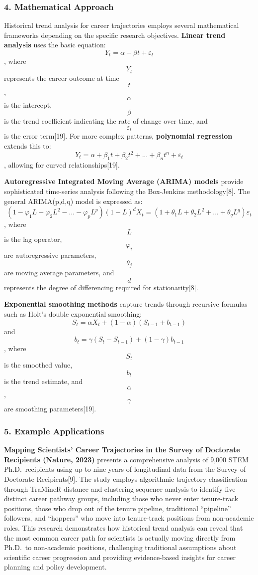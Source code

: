 \documentclass[./main.tex]{subfiles}
\begin{document}
\subsubsection{4. Mathematical Approach}\label{mathematical-approach}

Historical trend analysis for career trajectories employs several
mathematical frameworks depending on the specific research objectives.
\textbf{Linear trend analysis} uses the basic equation:
\[Y_t = α + βt + ε_t\], where \[Y_t\] represents the career outcome at
time \[t\], \[α\] is the intercept, \[β\] is the trend coefficient
indicating the rate of change over time, and \[ε_t\] is the error
term{[}19{]}. For more complex patterns, \textbf{polynomial regression}
extends this to: \[Y_t = α + β_1t + β_2t^2 + ... + β_nt^n + ε_t\],
allowing for curved relationships{[}19{]}.

\textbf{Autoregressive Integrated Moving Average (ARIMA) models} provide
sophisticated time-series analysis following the Box-Jenkins
methodology{[}8{]}. The general ARIMA(p,d,q) model is expressed as:
\[(1-φ_1L-φ_2L^2-...-φ_pL^p)(1-L)^d X_t = (1+θ_1L+θ_2L^2+...+θ_qL^q)ε_t\],
where \[L\] is the lag operator, \[φ_i\] are autoregressive parameters,
\[θ_j\] are moving average parameters, and \[d\] represents the degree
of differencing required for stationarity{[}8{]}.

\textbf{Exponential smoothing methods} capture trends through recursive
formulas such as Holt's double exponential smoothing:
\[S_t = αX_t + (1-α)(S_{t-1} + b_{t-1})\] and
\[b_t = γ(S_t - S_{t-1}) + (1-γ)b_{t-1}\], where \[S_t\] is the smoothed
value, \[b_t\] is the trend estimate, and \[α\], \[γ\] are smoothing
parameters{[}19{]}.

\subsubsection{5. Example Applications}\label{example-applications}

\textbf{Mapping Scientists' Career Trajectories in the Survey of
Doctorate Recipients (Nature, 2023)} presents a comprehensive analysis
of 9,000 STEM Ph.D.~recipients using up to nine years of longitudinal
data from the Survey of Doctorate Recipients{[}9{]}. The study employs
algorithmic trajectory classification through TraMineR distance and
clustering sequence analysis to identify five distinct career pathway
groups, including those who never enter tenure-track positions, those
who drop out of the tenure pipeline, traditional ``pipeline'' followers,
and ``hoppers'' who move into tenure-track positions from non-academic
roles. This research demonstrates how historical trend analysis can
reveal that the most common career path for scientists is actually
moving directly from Ph.D.~to non-academic positions, challenging
traditional assumptions about scientific career progression and
providing evidence-based insights for career planning and policy
development.
\end{document}
